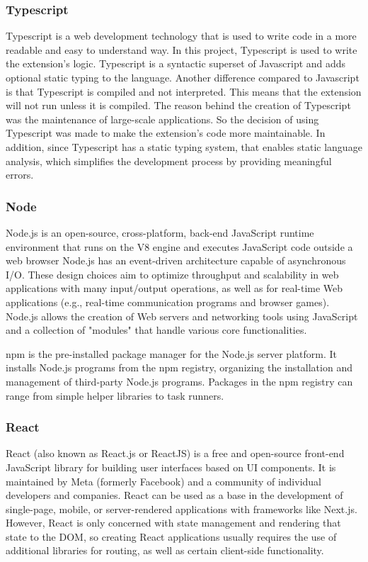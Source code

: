 \subsubsection {Typescript}

Typescript is a web development technology that is used to write code in a more readable and easy to understand way. In this project, Typescript is used to write the extension's logic.
Typescript is a syntactic superset of Javascript and adds optional static typing to the language. Another difference compared to Javascript is that Typescript is compiled and not interpreted. This means that the extension will not run unless it is compiled. The reason behind the creation of Typescript was the maintenance of large-scale applications. So the decision of using Typescript was made to make the extension's code more maintainable.
In addition, since Typescript has a static typing system, that enables static language analysis, which simplifies the development process by providing meaningful errors.
\subsubsection {Node}

Node.js is an open-source, cross-platform, back-end JavaScript runtime environment that runs on the V8 engine and executes JavaScript code outside a web browser
Node.js has an event-driven architecture capable of asynchronous I/O. These design choices aim to optimize throughput and scalability in web applications with many input/output operations, as well as for real-time Web applications (e.g., real-time communication programs and browser games).
Node.js allows the creation of Web servers and networking tools using JavaScript and a collection of "modules" that handle various core functionalities.

npm is the pre-installed package manager for the Node.js server platform. It installs Node.js programs from the npm registry, organizing the installation and management of third-party Node.js programs. Packages in the npm registry can range from simple helper libraries to task runners.

\subsubsection {React}

React (also known as React.js or ReactJS) is a free and open-source front-end JavaScript library for building user interfaces based on UI components. It is maintained by Meta (formerly Facebook) and a community of individual developers and companies. React can be used as a base in the development of single-page, mobile, or server-rendered applications with frameworks like Next.js. However, React is only concerned with state management and rendering that state to the DOM, so creating React applications usually requires the use of additional libraries for routing, as well as certain client-side functionality.

